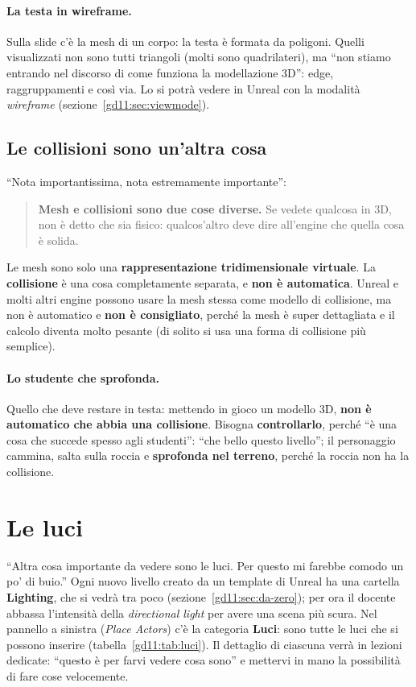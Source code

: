 \paragraph{La testa in wireframe.} Sulla slide c'è la mesh di un corpo: la
testa è formata da poligoni. Quelli visualizzati non sono tutti triangoli (molti
sono quadrilateri), ma ``non stiamo entrando nel discorso di come funziona la
modellazione 3D'': edge, raggruppamenti e così via. Lo si potrà vedere in
Unreal con la modalità \emph{wireframe} (sezione~\ref{gd11:sec:viewmode}).

\subsection{Le collisioni sono un'altra cosa}

``Nota importantissima, nota estremamente importante'':
\begin{quote}
\textbf{Mesh e collisioni sono due cose diverse.} Se vedete qualcosa in 3D, non
è detto che sia fisico: qualcos'altro deve dire all'engine che quella cosa è
solida.
\end{quote}
Le mesh sono solo una \textbf{rappresentazione tridimensionale virtuale}. La
\textbf{collisione} è una cosa completamente separata, e \textbf{non è
automatica}. Unreal e molti altri engine possono usare la mesh stessa come
modello di collisione, ma non è automatico e \textbf{non è consigliato}, perché
la mesh è super dettagliata e il calcolo diventa molto pesante (di solito si usa
una forma di collisione più semplice).

\paragraph{Lo studente che sprofonda.} Quello che deve restare in testa:
mettendo in gioco un modello 3D, \textbf{non è automatico che abbia una
collisione}. Bisogna \textbf{controllarlo}, perché ``è una cosa che succede
spesso agli studenti'': ``che bello questo livello''; il personaggio cammina,
salta sulla roccia e \textbf{sprofonda nel terreno}, perché la roccia non ha la
collisione.

\section{Le luci}
\label{gd11:sec:luci}

``Altra cosa importante da vedere sono le luci. Per questo mi farebbe comodo un
po' di buio.'' Ogni nuovo livello creato da un template di Unreal ha una
cartella \textbf{Lighting}, che si vedrà tra poco
(sezione~\ref{gd11:sec:da-zero}); per ora il docente abbassa l'intensità della
\emph{directional light} per avere una scena più scura. Nel pannello a sinistra
(\emph{Place Actors}) c'è la categoria \textbf{Luci}: sono tutte le luci che si
possono inserire (tabella~\ref{gd11:tab:luci}). Il dettaglio di ciascuna verrà
in lezioni dedicate: ``questo è per farvi vedere cosa sono'' e mettervi in mano
la possibilità di fare cose velocemente.

